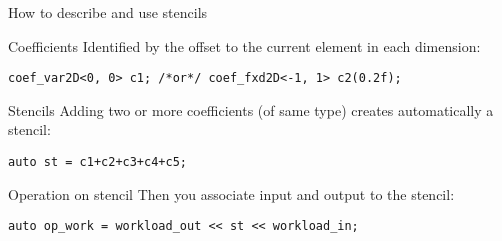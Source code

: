 \documentclass[10pt, compress]{beamer}
\begin{document}
\begin{frame}[fragile]{How to describe and use stencils}

\begin{block}{Coefficients}
Identified by the offset to the current element in each dimension:
\begin{verbatim}
coef_var2D<0, 0> c1; /*or*/ coef_fxd2D<-1, 1> c2(0.2f);
\end{verbatim}
\end{block}

\begin{block}{Stencils}
Adding two or more coefficients (of same type) creates automatically a stencil:
\begin{verbatim}
auto st = c1+c2+c3+c4+c5;
\end{verbatim}
\end{block}

\begin{block}{Operation on stencil}
Then you associate input and output to the stencil:
\begin{verbatim}
auto op_work = workload_out << st << workload_in;
\end{verbatim}
\end{block}

\end{frame}
\end{document}
